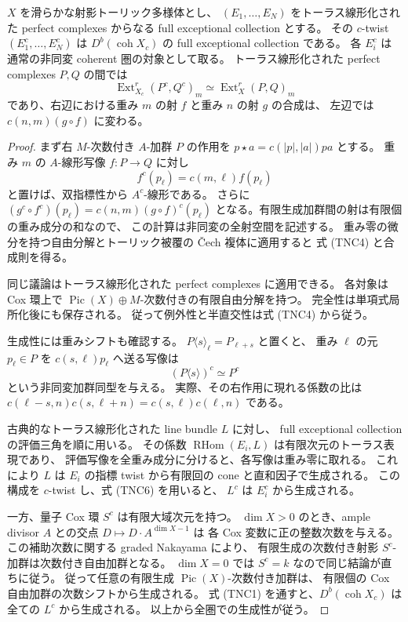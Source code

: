 \begin{lemma}\label{lem:toric-twist-homs-generation}
$X$ を滑らかな射影トーリック多様体とし、
$(E_1,\ldots,E_N)$ をトーラス線形化された perfect complexes からなる
full exceptional collection とする。
その $c$-twist $(E_1^c,\ldots,E_N^c)$ は
$D^b(\operatorname{coh}X_c)$ の full exceptional collection である。
各 $E_i^c$ は通常の非同変 coherent 圏の対象として取る。
トーラス線形化された perfect complexes $P,Q$ の間では
\[
 \operatorname{Ext}^r_{X_c}(P^c,Q^c)_m
 \simeq \operatorname{Ext}^r_X(P,Q)_m
 \tag{TNC4}
\]
であり、右辺における重み $m$ の射 $f$ と重み $n$ の射 $g$ の合成は、
左辺では $c(n,m)(g\circ f)$ に変わる。
\end{lemma}
\begin{proof}
まず右 $M$-次数付き $A$-加群 $P$ の作用を
$p\star a=c(|p|,|a|)pa$ とする。
重み $m$ の $A$-線形写像 $f:P\to Q$ に対し
\[
 f^c(p_\ell)=c(m,\ell)f(p_\ell)
 \tag{TNC5}
\]
と置けば、双指標性から $A^c$-線形である。
さらに
$(g^c\circ f^c)(p_\ell)=c(n,m)(g\circ f)^c(p_\ell)$
となる。有限生成加群間の射は有限個の重み成分の和なので、
この計算は非同変の全射空間を記述する。
重み零の微分を持つ自由分解とトーリック被覆の \v Cech 複体に適用すると
式 (TNC4) と合成則を得る。

同じ議論はトーラス線形化された perfect complexes に適用できる。
各対象は Cox 環上で
$\operatorname{Pic}(X)\oplus M$-次数付きの有限自由分解を持つ。
完全性は単項式局所化後にも保存される。
従って例外性と半直交性は式 (TNC4) から従う。

生成性には重みシフトも確認する。
$P\langle s\rangle_\ell=P_{\ell+s}$ と置くと、
重み $\ell$ の元 $p_\ell\in P$ を $c(s,\ell)p_\ell$ へ送る写像は
\[
 (P\langle s\rangle)^c\simeq P^c
 \tag{TNC6}
\]
という非同変加群同型を与える。
実際、その右作用に現れる係数の比は
$c(\ell-s,n)c(s,\ell+n)=c(s,\ell)c(\ell,n)$ である。

古典的なトーラス線形化された line bundle $L$ に対し、
full exceptional collection の評価三角を順に用いる。
その係数 $\operatorname{RHom}(E_i,L)$ は有限次元のトーラス表現であり、
評価写像を全重み成分に分けると、各写像は重み零に取れる。
これにより $L$ は $E_i$ の指標 twist から有限回の cone と直和因子で生成される。
この構成を $c$-twist し、式 (TNC6) を用いると、
$L^c$ は $E_i^c$ から生成される。

一方、量子 Cox 環 $S^c$ は有限大域次元を持つ。
$\dim X>0$ のとき、ample divisor $A$ との交点 $D\mapsto D\cdot A^{\dim X-1}$ は
各 Cox 変数に正の整数次数を与える。
この補助次数に関する graded Nakayama により、
有限生成の次数付き射影 $S^c$-加群は次数付き自由加群となる。
$\dim X=0$ では $S^c=k$ なので同じ結論が直ちに従う。
従って任意の有限生成 $\operatorname{Pic}(X)$-次数付き加群は、
有限個の Cox 自由加群の次数シフトから生成される。
式 (TNC1) を通すと、$D^b(\operatorname{coh}X_c)$ は全ての $L^c$ から生成される。
以上から全圏での生成性が従う。
\end{proof}

